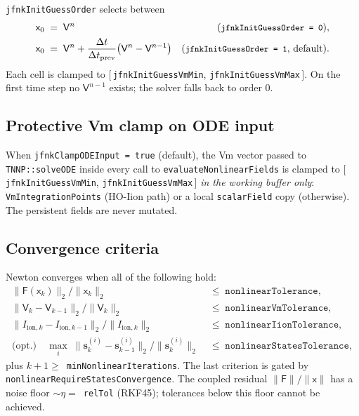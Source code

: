 \documentclass[11pt,a4paper]{article}
\newcommand{\Iionsub}[1]{I_{\text{ion},#1}}
\newcommand{\code}[1]{\texttt{\small #1}}
\begin{document}
\code{jfnkInitGuessOrder} selects between
\begin{align}
  \mathsf{x}_{0} &\;=\; \mathsf{V}^{n}
       & \text{(\code{jfnkInitGuessOrder = 0})}, \\
  \mathsf{x}_{0} &\;=\; \mathsf{V}^{n} + \frac{\Delta t}{\Delta t_{\text{prev}}}
        \bigl( \mathsf{V}^{n} - \mathsf{V}^{n-1} \bigr)
       & \text{(\code{jfnkInitGuessOrder = 1}, default).}
   \label{eq:extrap}
\end{align}
Each cell is clamped to $[\,$\code{jfnkInitGuessVmMin},
\code{jfnkInitGuessVmMax}$\,]$. On the first time step no
$\mathsf{V}^{n-1}$ exists; the solver falls back to order 0.

\subsection{Protective Vm clamp on ODE input}

When \code{jfnkClampODEInput = true} (default), the Vm vector passed to
\code{TNNP::solveODE} inside every call to \code{evaluateNonlinearFields}
is clamped to $[\,$\code{jfnkInitGuessVmMin}, \code{jfnkInitGuessVmMax}$\,]$
\emph{in the working buffer only}: \code{VmIntegrationPoints} (HO-Iion
path) or a local \code{scalarField} copy (otherwise). The persistent
fields are never mutated.

\subsection{Convergence criteria}

Newton converges when all of the following hold:
\begin{equation*}
\begin{aligned}
  \lVert \mathsf{F}(\mathsf{x}_{k}) \rVert_{2} / \lVert \mathsf{x}_{k} \rVert_{2}
     &\;\le\; \texttt{nonlinearTolerance}, \\
  \lVert \mathsf{V}_{k} - \mathsf{V}_{k-1} \rVert_{2} /
     \lVert \mathsf{V}_{k} \rVert_{2}
     &\;\le\; \texttt{nonlinearVmTolerance}, \\
  \lVert \Iionsub{k} - \Iionsub{k-1} \rVert_{2} /
     \lVert \Iionsub{k} \rVert_{2}
     &\;\le\; \texttt{nonlinearIionTolerance}, \\
  \text{(opt.)}\quad
  \max_{i}\;
  \lVert \mathbf{s}_{k}^{(i)} - \mathbf{s}_{k-1}^{(i)} \rVert_{2} /
     \lVert \mathbf{s}_{k}^{(i)} \rVert_{2}
     &\;\le\; \texttt{nonlinearStatesTolerance},
\end{aligned}
\end{equation*}
plus $k+1 \ge $~\code{minNonlinearIterations}. The last criterion is
gated by \code{nonlinearRequireStatesConvergence}. The coupled residual
$\lVert \mathsf{F} \rVert / \lVert \mathsf{x} \rVert$ has a noise floor
$\sim \eta = $~\code{relTol} (RKF45); tolerances below this floor
cannot be achieved.
\end{document}
